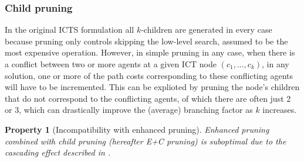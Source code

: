 \documentclass[english,10pt]{article}
\newtheorem{property}{Property}
\begin{document}
	\subsubsection{Child pruning}
	In the original ICTS formulation all $k$-children are generated in every case because pruning only controls skipping the low-level search, assumed to be the most expensive operation. However, in simple pruning in any case, when there is a conflict between two or more agents at a given ICT node $(c_1,\ldots,c_k)$, in any solution, one or more of the path costs corresponding to these conflicting agents will have to be incremented. This can be explioted by pruning the node's children that do not correspond to the conflicting agents, of which there are often just 2 or 3, which can drastically improve the (average) branching factor as $k$ increases.
	\begin{property}[Incompatibility with enhanced pruning]
		Enhanced pruning combined with child pruning (hereafter E+C pruning) is suboptimal due to the \textit{cascading effect} described in \cite{sharon2011}.
	\end{property}
\end{document}
